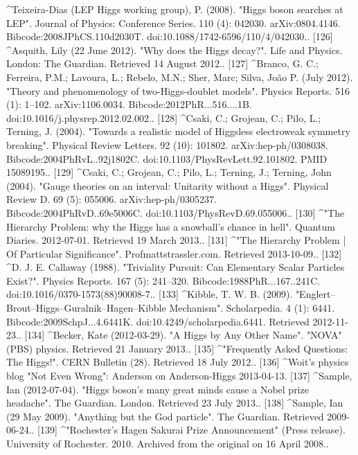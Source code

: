 \begin{enumerate}
[125]
^Teixeira-Dias (LEP Higgs working group), P. (2008). "Higgs boson searches at LEP". Journal of Physics: Conference Series. 110 (4): 042030. arXiv:0804.4146. Bibcode:2008JPhCS.110d2030T. doi:10.1088/1742-6596/110/4/042030..
[126]
^Asquith, Lily (22 June 2012). "Why does the Higgs decay?". Life and Physics. London: The Guardian. Retrieved 14 August 2012..
[127]
^Branco, G. C.; Ferreira, P.M.; Lavoura, L.; Rebelo, M.N.; Sher, Marc; Silva, João P. (July 2012). "Theory and phenomenology of two-Higgs-doublet models". Physics Reports. 516 (1): 1–102. arXiv:1106.0034. Bibcode:2012PhR...516....1B. doi:10.1016/j.physrep.2012.02.002..
[128]
^Csaki, C.; Grojean, C.; Pilo, L.; Terning, J. (2004). "Towards a realistic model of Higgsless electroweak symmetry breaking". Physical Review Letters. 92 (10): 101802. arXiv:hep-ph/0308038. Bibcode:2004PhRvL..92j1802C. doi:10.1103/PhysRevLett.92.101802. PMID 15089195..
[129]
^Csaki, C.; Grojean, C.; Pilo, L.; Terning, J.; Terning, John (2004). "Gauge theories on an interval: Unitarity without a Higgs". Physical Review D. 69 (5): 055006. arXiv:hep-ph/0305237. Bibcode:2004PhRvD..69e5006C. doi:10.1103/PhysRevD.69.055006..
[130]
^"The Hierarchy Problem: why the Higgs has a snowball's chance in hell". Quantum Diaries. 2012-07-01. Retrieved 19 March 2013..
[131]
^"The Hierarchy Problem | Of Particular Significance". Profmattstrassler.com. Retrieved 2013-10-09..
[132]
^D. J. E. Callaway (1988). "Triviality Pursuit: Can Elementary Scalar Particles Exist?". Physics Reports. 167 (5): 241–320. Bibcode:1988PhR...167..241C. doi:10.1016/0370-1573(88)90008-7..
[133]
^Kibble, T. W. B. (2009). "Englert–Brout–Higgs–Guralnik–Hagen–Kibble Mechanism". Scholarpedia. 4 (1): 6441. Bibcode:2009SchpJ...4.6441K. doi:10.4249/scholarpedia.6441. Retrieved 2012-11-23..
[134]
^Becker, Kate (2012-03-29). "A Higgs by Any Other Name". "NOVA" (PBS) physics. Retrieved 21 January 2013..
[135]
^"Frequently Asked Questions: The Higgs!". CERN Bulletin (28). Retrieved 18 July 2012..
[136]
^Woit's physics blog "Not Even Wrong": Anderson on Anderson-Higgs 2013-04-13.
[137]
^Sample, Ian (2012-07-04). "Higgs boson's many great minds cause a Nobel prize headache". The Guardian. London. Retrieved 23 July 2013..
[138]
^Sample, Ian (29 May 2009). "Anything but the God particle". The Guardian. Retrieved 2009-06-24..
[139]
^"Rochester's Hagen Sakurai Prize Announcement" (Press release). University of Rochester. 2010. Archived from the original on 16 April 2008..
\end{enumerate}
